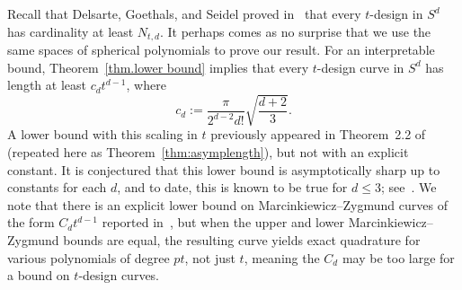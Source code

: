 \documentclass[12pt]{article}
\theoremstyle{plain}
\theoremstyle{definition}
\theoremstyle{remark}
\begin{document}
Recall that Delsarte, Goethals, and Seidel proved in~\cite{DelsarteGS:77} that every $t$-design in $S^d$ has cardinality at least $N_{t,d}$.
It perhaps comes as no surprise that we use the same spaces of spherical polynomials to prove our result. 
For an interpretable bound, Theorem~\ref{thm.lower bound} implies that every $t$-design curve in $S^d$ has length at least $c_d t^{d-1}$, where
\[
c_d
:=\frac{\pi}{2^{d-2}d!}\sqrt{\frac{d+2}{3}}.
\]
A lower bound with this scaling in $t$ previously appeared in Theorem~2.2 of~\cite{EhlerG:23} (repeated here as Theorem~\ref{thm:asymplength}), but not with an explicit constant.
It is conjectured that this lower bound is asymptotically sharp up to constants for each $d$, and to date, this is known to be true for $d\leq 3$; see~\cite{EhlerG:23,Lindblad:24}.
We note that there is an explicit lower bound on Marcinkiewicz--Zygmund curves of the form $C_d t^{d-1}$ reported in~\cite{EhlerG:25}, but when the upper and lower Marcinkiewicz--Zygmund bounds are equal, the resulting curve yields exact quadrature for various polynomials of degree $pt$, not just $t$, meaning the $C_d$ may be too large for a bound on $t$-design curves.
\end{document}
